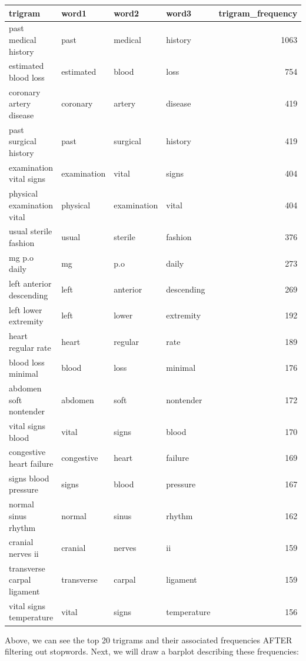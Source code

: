 \documentclass[
]{article}
\begin{document}
\begin{table}
\centering
\begin{tabular}{l|l|l|l|r}
\hline
trigram & word1 & word2 & word3 & trigram\_frequency\\
\hline
past medical history & past & medical & history & 1063\\
\hline
estimated blood loss & estimated & blood & loss & 754\\
\hline
coronary artery disease & coronary & artery & disease & 419\\
\hline
past surgical history & past & surgical & history & 419\\
\hline
examination vital signs & examination & vital & signs & 404\\
\hline
physical examination vital & physical & examination & vital & 404\\
\hline
usual sterile fashion & usual & sterile & fashion & 376\\
\hline
mg p.o daily & mg & p.o & daily & 273\\
\hline
left anterior descending & left & anterior & descending & 269\\
\hline
left lower extremity & left & lower & extremity & 192\\
\hline
heart regular rate & heart & regular & rate & 189\\
\hline
blood loss minimal & blood & loss & minimal & 176\\
\hline
abdomen soft nontender & abdomen & soft & nontender & 172\\
\hline
vital signs blood & vital & signs & blood & 170\\
\hline
congestive heart failure & congestive & heart & failure & 169\\
\hline
signs blood pressure & signs & blood & pressure & 167\\
\hline
normal sinus rhythm & normal & sinus & rhythm & 162\\
\hline
cranial nerves ii & cranial & nerves & ii & 159\\
\hline
transverse carpal ligament & transverse & carpal & ligament & 159\\
\hline
vital signs temperature & vital & signs & temperature & 156\\
\hline
\end{tabular}
\end{table}

Above, we can see the top 20 trigrams and their associated frequencies
AFTER filtering out stopwords. Next, we will draw a barplot describing
these frequencies:
\end{document}
